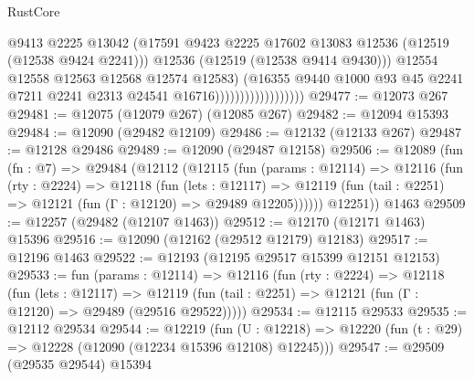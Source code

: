 \begin{lexlean}{RustCore}
\begin{coremodule}
                                          @9413
                                          @2225
                                          @13042
                                          (@17591
                                            @9423
                                            @2225
                                            @17602
                                            @13083
                                            @12536
                                            (@12519 (@12538 @9424 @2241)))
                                          @12536
                                          (@12519 (@12538 @9414 @9430)))
                                        @12554
                                        @12558
                                        @12563
                                        @12568
                                        @12574
                                        @12583)
                                      (@16355
                                        @9440
                                        @1000
                                        @93
                                        @45
                                        @2241
                                        @7211
                                        @2241
                                        @2313
                                        @24541
                                        @16716))))))))))))))))))
@29477 := @12073 @267
@29481 := @12075 (@12079 @267) (@12085 @267)
@29482 := @12094 @15393
@29484 := @12090 (@29482 @12109)
@29486 := @12132 (@12133 @267)
@29487 := @12128 @29486
@29489 := @12090 (@29487 @12158)
@29506 := @12089
    (fun (fn : @7) =>
    @29484
      (@12112
        (@12115
          (fun (params : @12114) =>
          @12116
            (fun (rty : @2224) =>
            @12118
              (fun (lets : @12117) =>
              @12119 (fun (tail : @2251) => @12121 (fun (Γ : @12120) => @29489 @12205))))))
        @12251))
    @1463
@29509 := @12257 (@29482 (@12107 @1463))
@29512 := @12170 (@12171 @1463) @15396
@29516 := @12090 (@12162 (@29512 @12179) @12183)
@29517 := @12196 @1463
@29522 := @12193 (@12195 @29517 @15399 @12151 @12153)
@29533 := fun (params : @12114) =>
  @12116
    (fun (rty : @2224) =>
    @12118
      (fun (lets : @12117) =>
      @12119 (fun (tail : @2251) => @12121 (fun (Γ : @12120) => @29489 (@29516 @29522)))))
@29534 := @12115 @29533
@29535 := @12112 @29534
@29544 := @12219
    (fun (U : @12218) => @12220 (fun (t : @29) => @12228 (@12090 (@12234 @15396 @12108) @12245)))
@29547 := @29509 (@29535 @29544) @15394

\end{coremodule}
\end{lexlean}
